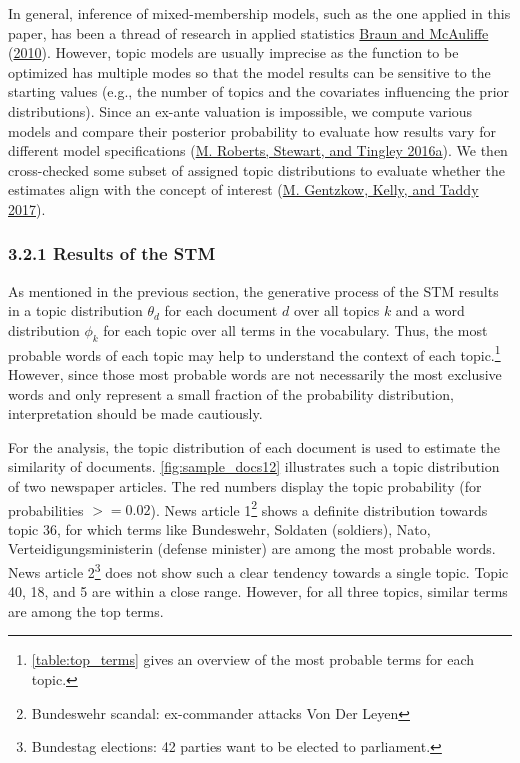 \documentclass[
  12pt,
]{article}
\begin{document}
In general, inference of mixed-membership models, such as the one
applied in this paper, has been a thread of research in applied
statistics \protect\hyperlink{ref-braun_variational_2010}{Braun and
McAuliffe} (\protect\hyperlink{ref-braun_variational_2010}{2010}).
However, topic models are usually imprecise as the function to be
optimized has multiple modes so that the model results can be sensitive
to the starting values (e.g., the number of topics and the covariates
influencing the prior distributions). Since an ex-ante valuation is
impossible, we compute various models and compare their posterior
probability to evaluate how results vary for different model
specifications (\protect\hyperlink{ref-roberts_navigating_2016}{M.
Roberts, Stewart, and Tingley 2016a}). We then cross-checked some subset
of assigned topic distributions to evaluate whether the estimates align
with the concept of interest
(\protect\hyperlink{ref-gentzkow_text_2017}{M. Gentzkow, Kelly, and
Taddy 2017}).

\hypertarget{results-of-the-stm}{%
\subsubsection{3.2.1 Results of the STM}\label{results-of-the-stm}}

As mentioned in the previous section, the generative process of the STM
results in a topic distribution \(\theta_d\) for each document \(d\)
over all topics \(k\) and a word distribution \(\phi_k\) for each topic
over all terms in the vocabulary. Thus, the most probable words of each
topic may help to understand the context of each topic.\footnote{\autoref{table:top_terms}
  gives an overview of the most probable terms for each topic.} However,
since those most probable words are not necessarily the most exclusive
words and only represent a small fraction of the probability
distribution, interpretation should be made cautiously.

For the analysis, the topic distribution of each document is used to
estimate the similarity of documents. \autoref{fig:sample_docs12}
illustrates such a topic distribution of two newspaper articles. The red
numbers display the topic probability (for probabilities \(>= 0.02\)).
News article 1\footnote{Bundeswehr scandal: ex-commander attacks Von Der
  Leyen} shows a definite distribution towards topic 36, for which terms
like Bundeswehr, Soldaten (soldiers), Nato, Verteidigungsministerin
(defense minister) are among the most probable words. News article
2\footnote{Bundestag elections: 42 parties want to be elected to
  parliament.} does not show such a clear tendency towards a single
topic. Topic 40, 18, and 5 are within a close range. However, for all
three topics, similar terms are among the top terms.
\end{document}
